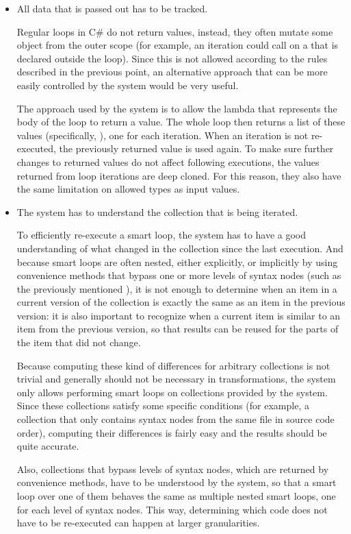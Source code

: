 \begin{itemize}
\item All data that is passed out has to be tracked.

Regular loops in C\# do not return values, instead, they often mutate some object from the outer scope (for example, an iteration could call  on a  that is declared outside the loop). Since this is not allowed according to the rules described in the previous point, an alternative approach that can be more easily controlled by the system would be very useful.

The approach used by the system is to allow the lambda that represents the body of the loop to return a value. The whole loop then returns a list of these values (specifically, ), one for each iteration. When an iteration is not re-executed, the previously returned value is used again. To make sure further changes to returned values do not affect following executions, the values returned from loop iterations are deep cloned. For this reason, they also have the same limitation on allowed types as input values.

\item The system has to understand the collection that is being iterated.

To efficiently re-execute a smart loop, the system has to have a good understanding of what changed in the collection since the last execution. And because smart loops are often nested, either explicitly, or implicitly by using convenience methods that bypass one or more levels of syntax nodes (such as the previously mentioned ), it is not enough to determine when an item in a current version of the collection is exactly the same as an item in the previous version: it is also important to recognize when a current item is similar to an item from the previous version, so that results can be reused for the parts of the item that did not change.

Because computing these kind of differences for arbitrary collections is not trivial and generally should not be necessary in transformations, the system only allows performing smart loops on collections provided by the system. Since these collections satisfy some specific conditions (for example, a collection that only contains syntax nodes from the same file in source code order), computing their differences is fairly easy and the results should be quite accurate.

Also, collections that bypass levels of syntax nodes, which are returned by convenience methods, have to be understood by the system, so that a smart loop over one of them behaves the same as multiple nested smart loops, one for each level of syntax nodes. This way, determining which code does not have to be re-executed can happen at larger granularities.


\end{itemize}
